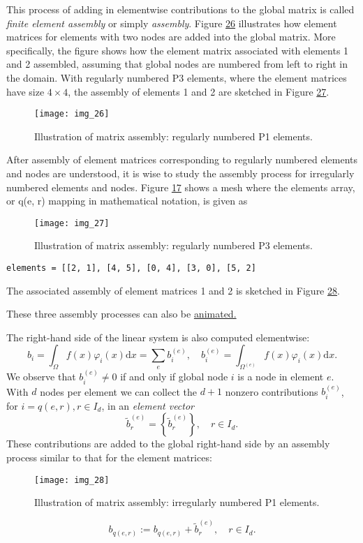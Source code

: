 \documentclass[../main.tex]{subfiles}
\begin{document}
This process of adding in elementwise contributions to the global matrix is called \textit{finite element assembly} or simply \textit{assembly}. Figure \hyperref[fig:img_26]{26} illustrates how element matrices for elements with two nodes are added into the global matrix. More specifically, the figure shows how the element matrix associated with elements 1 and 2 assembled, assuming that global nodes are numbered from left to right in the domain. With regularly numbered P3 elements, where the element matrices have size $4 \times 4$, the assembly of elements 1 and 2 are sketched in Figure \hyperref[fig:img_27]{27}.
\begin{figure}[H]
	\centering
	\texttt{[image: img\_26]}
	\caption{Illustration of matrix assembly: regularly numbered P1 elements.}
	\label{fig:img_26}
\end{figure}

After assembly of element matrices corresponding to regularly numbered
elements and nodes are understood, it is wise to study the assembly process for
irregularly numbered elements and nodes. Figure \hyperref[fig:img_17]{17} shows a mesh where the
elements array, or q(e, r) mapping in mathematical notation, is given as
\begin{figure}[H]
	\centering
	\texttt{[image: img\_27]}
	\caption{Illustration of matrix assembly: regularly numbered P3 elements.}
	\label{fig:img_27}
\end{figure}

\begin{lstlisting}[numbers=none]
elements = [[2, 1], [4, 5], [0, 4], [3, 0], [5, 2]
\end{lstlisting}
The associated assembly of element matrices 1 and 2 is sketched in Figure \hyperref[fig:img_28]{28}. 

These three assembly processes can also be \href{http://hplgit.github.io/INF5620/doc/pub/mov-fem/fe_assembly.html}{animated.}


The right-hand side of the linear system is also computed elementwise:
\begin{equation}\label{eqa59}
	b_{i}=\int_{\Omega} f(x) \varphi_{i}(x) \mathrm{d} x=\sum_{e} b_{i}^{(e)}, \quad b_{i}^{(e)}=\int_{\Omega^{(e)}} f(x) \varphi_{i}(x) \mathrm{d} x.
\end{equation}
We observe that $b_{i}^{(e)} \neq 0$ if and only if global node $i$ is a node in element $e$. With $d$ nodes per element we can collect the $d+1$ nonzero contributions $b_{i}^{(e)}$, for $i=q(e, r), r \in I_{d}$, in an \textit{element vector}
$$
\tilde{b}_{r}^{(e)}=\left\{\tilde{b}_{r}^{(e)}\right\}, \quad r \in I_{d} .
$$
These contributions are added to the global right-hand side by an assembly process similar to that for the element matrices:
\begin{figure}[H]
	\centering
	\texttt{[image: img\_28]}
	\caption{Illustration of matrix assembly: irregularly numbered P1 elements.}
	\label{fig:img_28}
\end{figure}
\begin{equation}\label{eqa60}
	b_{q(e, r)}:=b_{q(e, r)}+\tilde{b}_{r}^{(e)}, \quad r \in I_{d}.
\end{equation}
\end{document}
